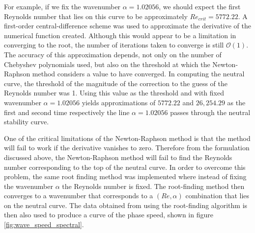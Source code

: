 \documentclass[a4paper, 12pt, twoside, openright]{article}
\numberwithin{equation}{section}
\begin{document}
For example, if we fix the wavenumber $\alpha=1.02056$, we should expect the first Reynolds number that lies on this curve to be approximately $Re_{crit}=5772.22$. A first-order central-difference scheme was used to approximate the derivative of the numerical function created. Although this would appear to be a limitation in converging to the root, the number of iterations taken to converge is still $\mathcal{O}(1)$. The accuracy of this approximation depends, not only on the number of Chebyshev polynomials used, but also on the threshold at which the Newton-Raphson method considers a value to have converged. In computing the neutral curve, the threshold of the magnitude of the correction to the guess of the Reynolds number was 1. Using this value as the threshold and with fixed wavenumber $\alpha=1.02056$ yields approximations of $5772.22$ and $26,254.29$ as the first and second time respectively the line $\alpha=1.02056$ passes through the neutral stability curve.%

One of the critical limitations of the Newton-Raphson method is that the method will fail to work if the derivative vanishes to zero. Therefore from the formulation discussed above, the Newton-Raphson method will fail to find the Reynolds number corresponding to the top of the neutral curve. In order to overcome this problem, the same root finding method was implemented where instead of fixing the wavenumber $\alpha$ the Reynolds number is fixed. The root-finding method then converges to a wavenumber that corresponds to a $(Re,\alpha)$ combination that lies on the neutral curve. The data obtained from using the root-finding algorithm is then also used to produce a curve of the phase speed, shown in figure \ref{fig:wave_speed_spectral}. 

% 
%
%
%


\newpage
\end{document}
